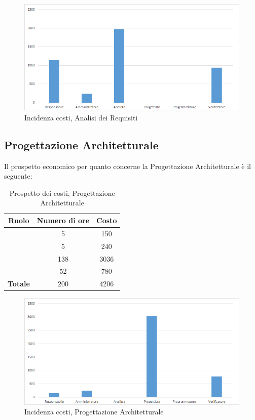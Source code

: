 \begin{figure}[H]
	\centering
	\includegraphics[scale=0.6]{img/8-1.png}
	\caption{Incidenza costi, Analisi dei Requisiti}
\end{figure}

\subsection{Progettazione Architetturale}
Il prospetto economico per quanto concerne la Progettazione Architetturale è il seguente:


\begin{table}[H]
	\begin{center}
		\begin{tabular}{|c|c|c|}
			\hline
			\textbf{Ruolo}	& \textbf{Numero di ore} & \textbf{Costo} \\
			\hline
			\Res	&	5  &	150	\\
			\hline
			\Amm	&	5  &	240	\\
			\hline
			\Prog	&	138  &	3036	\\
			\hline
			\Ver	&	52  &	780	\\
			\hline
			\textbf{Totale}  &	200 &	4206	\\
			\hline
		\end{tabular}
	\end{center}
	\caption{Prospetto dei costi, Progettazione Architetturale }
\end{table}

\begin{figure}[H]
	\centering
	\includegraphics[scale=0.6]{img/8-2.png}
	\caption{Incidenza costi, Progettazione Architetturale}
\end{figure}


